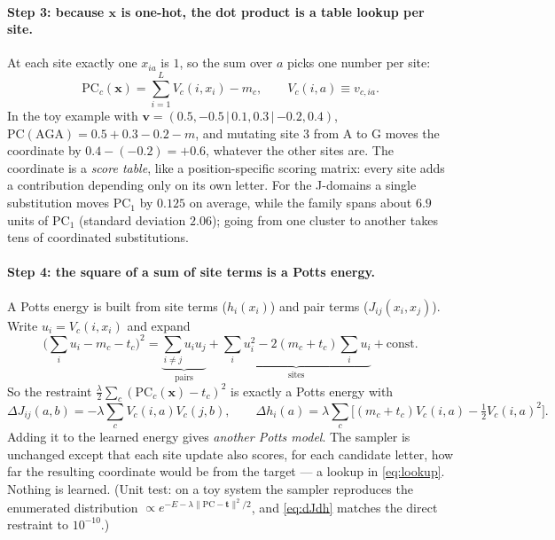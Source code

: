 \documentclass[10pt,a4paper]{article}
\newcommand{\PC}{\mathrm{PC}}
\begin{document}
\paragraph{Step 3: because $\bm x$ is one-hot, the dot product is a table lookup per site.} At each
site exactly one $x_{ia}$ is $1$, so the sum over $a$ picks one number per site:
\begin{equation}
\PC_c(\bm x)=\sum_{i=1}^{L}V_c(i,x_i)-m_c ,\qquad V_c(i,a)\equiv v_{c,ia}.
\label{eq:lookup}
\end{equation}
In the toy example with $\bm v=(0.5,-0.5\,|\,0.1,0.3\,|\,{-0.2},0.4)$, $\PC(\mathrm{AGA})=0.5+0.3-0.2-m$,
and mutating site 3 from A to G moves the coordinate by $0.4-(-0.2)=+0.6$, whatever the other sites
are. The coordinate is a \emph{score table}, like a position-specific scoring matrix: every site adds a
contribution depending only on its own letter. For the J-domains a single substitution moves
$\PC_1$ by $0.125$ on average, while the family spans about $6.9$ units of $\PC_1$ (standard deviation $2.06$); going from one cluster to
another takes tens of coordinated substitutions.

\paragraph{Step 4: the square of a sum of site terms is a Potts energy.} A Potts energy is built from
site terms ($h_i(x_i)$) and pair terms ($J_{ij}(x_i,x_j)$). Write $u_i=V_c(i,x_i)$ and expand
\[
\Big(\sum_i u_i-m_c-t_c\Big)^2=\underbrace{\sum_{i\neq j}u_iu_j}_{\text{pairs}}
+\underbrace{\sum_iu_i^2-2(m_c+t_c)\sum_iu_i}_{\text{sites}}+\text{const}.
\]
So the restraint $\frac{\lambda}{2}\sum_c(\PC_c(\bm x)-t_c)^2$ is exactly a Potts energy with
\begin{equation}
\Delta J_{ij}(a,b)=-\lambda\sum_cV_c(i,a)V_c(j,b),\qquad
\Delta h_i(a)=\lambda\sum_c\big[(m_c+t_c)V_c(i,a)-\tfrac12V_c(i,a)^2\big].
\label{eq:dJdh}
\end{equation}
Adding it to the learned energy gives \emph{another Potts model}. The sampler is unchanged except
that each site update also scores, for each candidate letter, how far the resulting coordinate
would be from the target --- a lookup in \eqref{eq:lookup}. Nothing is learned. (Unit test: on a toy
system the sampler reproduces the enumerated distribution $\propto e^{-E-\lambda\|\PC-\bm t\|^2/2}$,
and \eqref{eq:dJdh} matches the direct restraint to $10^{-10}$.)
\end{document}
